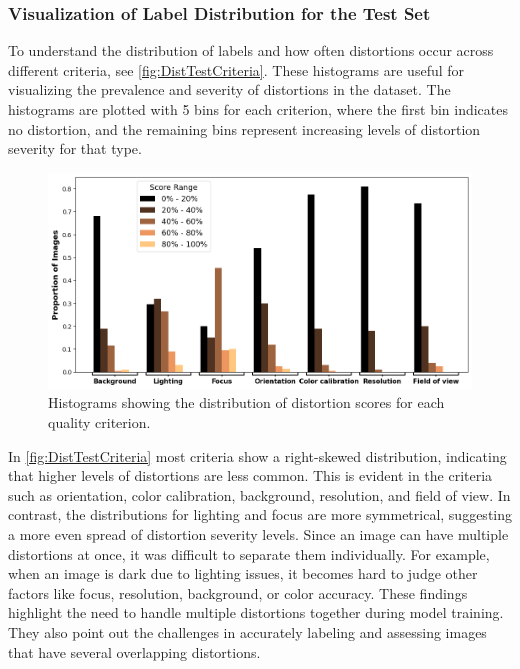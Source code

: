 \subsubsection{Visualization of Label Distribution for the Test Set}
\label{subsub:LabelDist}
To understand the distribution of labels and how often distortions occur across different criteria, see \autoref{fig:DistTestCriteria}. These histograms are useful for visualizing the prevalence and severity of distortions in the dataset. The histograms are plotted with 5 bins for each criterion, where the first bin indicates no distortion, and the remaining bins represent increasing levels of distortion severity for that type. \par
\begin{figure}[ht]
    \centering
    \includegraphics[keepaspectratio,width=15cm]{img/Distribution_test_criteria.png}
    \caption{Histograms showing the distribution of distortion scores for each quality criterion.}
    \label{fig:DistTestCriteria}
\end{figure}
\noindent
In \autoref{fig:DistTestCriteria} most criteria show a right-skewed distribution, indicating that higher levels of distortions are less common. This is evident in the criteria such as orientation, color calibration, background, resolution, and field of view. In contrast, the distributions for lighting and focus are more symmetrical, suggesting a more even spread of distortion severity levels. Since an image can have multiple distortions at once, it was difficult to separate them individually. For example, when an image is dark due to lighting issues, it becomes hard to judge other factors like focus, resolution, background, or color accuracy. These findings highlight the need to handle multiple distortions together during model training. They also point out the challenges in accurately labeling and assessing images that have several overlapping distortions. \par
